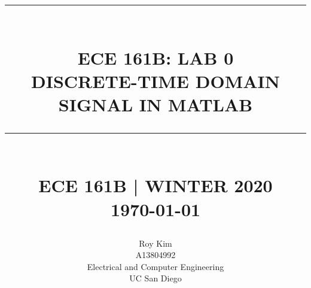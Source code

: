 \begin{titlepage}
    \newcommand{\HRule}[1]{\rule{\linewidth}{#1}} 	%
    \makeatletter							%
    \def\printtitle{%
        {\centering \@title\par}}
    \makeatother									
    
    \makeatletter							%
    \def\printauthor{%
        {\centering \large \@author}}				
    \makeatother							

    \title{	\normalsize \textsc{} 	%
    		 	\\[2.0cm]								%
    			\HRule{0.5pt} \\						%
    			\LARGE \textbf{\uppercase{ECE 161B: Lab 0\\ Discrete-Time Domain Signal in MATLAB}}	%
    			\HRule{2pt} \\ [0.5cm]		%
    			\normalsize ECE 161B | WINTER 2020\\
    			\today			%
    		}
    
    \author{
    		Roy Kim\\	
    		A13804992\\
    		Electrical and Computer Engineering\\	
    		UC San Diego\\
    }
    
    \thispagestyle{empty}		%
    
    \printtitle					%
      	\vfill
    \printauthor				%
    \newpage

\end{titlepage}